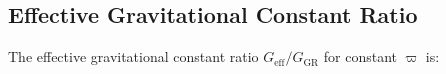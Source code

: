 \documentclass{article}
\newcommand{\Mp}{M_{\mathrm{P}}}
\newcommand{\rhor}{\rho_r}
\newcommand{\rhoL}{\rho_\Lambda}
\begin{document}




\subsection{Effective Gravitational Constant Ratio}

The effective gravitational constant ratio $G_{\text{eff}}/G_{\text{GR}}$ for constant $\varpi$ is:
\end{document}
